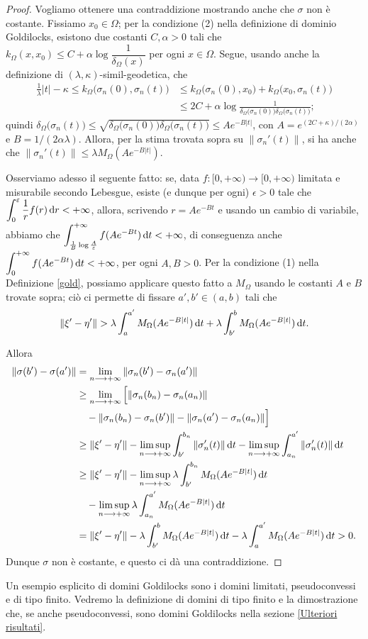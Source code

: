 \begin{proof}
    Vogliamo ottenere una contraddizione mostrando anche che $\sigma$ non è costante. Fissiamo $x_0\in\Omega$; per la condizione (2) nella definizione di dominio Goldilocks, esistono due costanti $C,\alpha>0$ tali che $k_\Omega(x,x_0) \le C+\alpha\log{\dfrac{1}{\delta_\Omega(x)}}$ per ogni $x\in\Omega$. Segue, usando anche la definizione di $(\lambda,\kappa)$-simil-geodetica, che
    \begin{align*}
        \frac{1}{\lambda}|t|-\kappa \le k_\Omega\big(\sigma_n(0),\sigma_n(t)\big) &\le k_\Omega\big(\sigma_n(0),x_0\big)+k_\Omega\big(x_0,\sigma_n(t)\big)\\
        &\le 2C+\alpha\log{\frac{1}{\delta_\Omega\big(\sigma_n(0)\big)\delta_\Omega\big(\sigma_n(t)\big)}};
    \end{align*}
    quindi $\delta_\Omega\big(\sigma_n(t)\big) \le \sqrt{\delta_\Omega\big(\sigma_n(0)\big)\delta_\Omega\big(\sigma_n(t)\big)} \le Ae^{-B|t|}$, con $A=e^{(2C+\kappa)/(2\alpha)}$ e $B=1/(2\alpha\lambda)$. Allora, per la stima trovata sopra su $\|\sigma_n'(t)\|$, si ha anche che $\|\sigma_n'(t)\| \le \lambda M_\Omega(Ae^{-B|t|})$.
    
    Osserviamo adesso il seguente fatto: se, data $f:[0,+\infty)\longrightarrow[0,+\infty)$ limitata e misurabile secondo Lebesgue, esiste (e dunque per ogni) $\epsilon>0$ tale che $\displaystyle \int_0^\varepsilon \frac{1}{r}f(r)\mathop{}\!\mathrm{d} r<+\infty$, allora, scrivendo $r=Ae^{-Bt}$ e usando un cambio di variabile, abbiamo che $\displaystyle\int_{\frac{1}{B}\log\frac{A}{\varepsilon}}^{+\infty} f(Ae^{-Bt})\mathop{}\!\mathrm{d} t<+\infty$, di conseguenza anche $\displaystyle\int_0^{+\infty} f(Ae^{-Bt})\mathop{}\!\mathrm{d} t<+\infty$, per ogni $A,B>0$. Per la condizione (1) nella Definizione \ref{gold}, possiamo applicare questo fatto a $M_\Omega$ usando le costanti $A$ e $B$ trovate sopra; ciò ci permette di fissare $a',b'\in(a,b)$ tali che
    $$\|\xi'-\eta'\|>\lambda\int_a^{a'} M_\Omega(Ae^{-B|t|})\diff t+\lambda\int_{b'}^b M_\Omega(Ae^{-B|t|})\diff t.$$

    Allora
    \begin{align*}
        \|\sigma(b')-\sigma(a')\|&=\lim_{n\longrightarrow+\infty}\|\sigma_n(b')-\sigma_n(a')\| \\
        & \ge \lim_{n\longrightarrow+\infty}\Big[\|\sigma_n(b_n)-\sigma_n(a_n)\|\\
        &\quad-\|\sigma_n(b_n)-\sigma_n(b')\|-\|\sigma_n(a')-\sigma_n(a_n)\|\Big] \\
        &\ge \|\xi'-\eta'\|-\limsup_{n\longrightarrow+\infty}\int_{b'}^{b_n}\|\sigma_n'(t)\|\mathop{}\!\mathrm{d} t-\limsup_{n\longrightarrow+\infty}\int_{a_n}^{a'}\|\sigma_n'(t)\|\mathop{}\!\mathrm{d} t\\
        &\ge \|\xi'-\eta'\|-\limsup_{n\longrightarrow+\infty}\lambda\int_{b'}^{b_n}M_\Omega(Ae^{-B|t|})\mathop{}\!\mathrm{d} t\\
        &\quad-\limsup_{n\longrightarrow+\infty}\lambda\int_{a_n}^{a'}M_\Omega(Ae^{-B|t|})\mathop{}\!\mathrm{d} t\\
        &=\|\xi'-\eta'\|-\lambda\int_{b'}^b M_\Omega(Ae^{-B|t|})\mathop{}\!\mathrm{d} t-\lambda\int_a^{a'}M_\Omega(Ae^{-B|t|})\mathop{}\!\mathrm{d} t>0.
    \end{align*}
    Dunque $\sigma$ non è costante, e questo ci dà una contraddizione.
\end{proof}

Un esempio esplicito di domini Goldilocks sono i domini limitati, pseudoconvessi e di tipo finito. Vedremo la definizione di domini di tipo finito e la dimostrazione che, se anche pseudoconvessi, sono domini Goldilocks nella sezione \ref{Ulteriori risultati}.